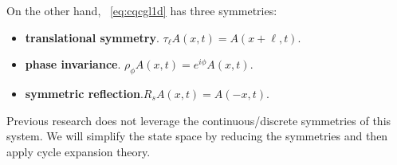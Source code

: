 On the other hand,
\CqcGL\ \eqref{eq:cqcgl1d} has three symmetries:
\begin{itemize}
\item  \textbf{translational symmetry}. $\tau_\ell A(x,t) = A(x+\ell,t)$.
\item \textbf{phase invariance}. $\rho_\phi A(x,t) = e^{i\phi}A(x,t)$.
\item \textbf{symmetric reflection}.$R_s A(x,t) = A(-x, t)$.
\end{itemize}
Previous research does not leverage the continuous/discrete symmetries
of this system. We will
simplify the state space by reducing the symmetries and then apply
cycle expansion theory.
